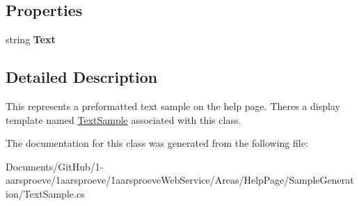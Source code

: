 \subsection*{Properties}
\begin{DoxyCompactItemize}
\item 
\hypertarget{class__1aarsproeve_web_service_1_1_areas_1_1_help_page_1_1_text_sample_af691a0f912794fd1c606e7d0fa73dbee}{}string {\bfseries Text}\label{class__1aarsproeve_web_service_1_1_areas_1_1_help_page_1_1_text_sample_af691a0f912794fd1c606e7d0fa73dbee}

\end{DoxyCompactItemize}


\subsection{Detailed Description}
This represents a preformatted text sample on the help page. There\textquotesingle{}s a display template named \hyperlink{class__1aarsproeve_web_service_1_1_areas_1_1_help_page_1_1_text_sample}{Text\+Sample} associated with this class. 



The documentation for this class was generated from the following file\+:\begin{DoxyCompactItemize}
\item 
Documents/\+Git\+Hub/1-\/aarsproeve/1aarsproeve/1aarsproeve\+Web\+Service/\+Areas/\+Help\+Page/\+Sample\+Generation/Text\+Sample.\+cs\end{DoxyCompactItemize}
